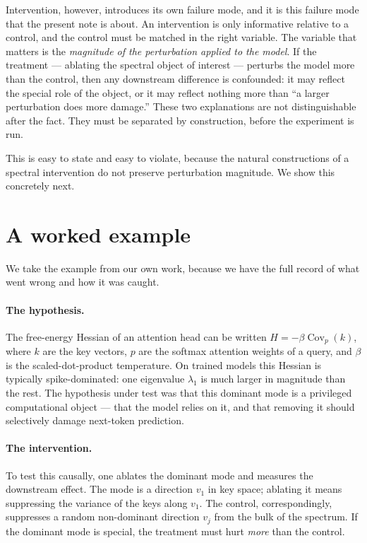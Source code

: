 \documentclass[11pt]{article}
\begin{document}
Intervention, however, introduces its own failure mode, and it is this
failure mode that the present note is about. An intervention is only
informative relative to a control, and the control must be matched in the
right variable. The variable that matters is the \emph{magnitude of the
perturbation applied to the model}. If the treatment --- ablating the
spectral object of interest --- perturbs the model more than the control,
then any downstream difference is confounded: it may reflect the special
role of the object, or it may reflect nothing more than ``a larger
perturbation does more damage.'' These two explanations are not
distinguishable after the fact. They must be separated by construction,
before the experiment is run.

This is easy to state and easy to violate, because the natural
constructions of a spectral intervention do not preserve perturbation
magnitude. We show this concretely next.

\section{A worked example}
\label{sec:example}

We take the example from our own work, because we have the full record of
what went wrong and how it was caught.

\paragraph{The hypothesis.}
The free-energy Hessian of an attention head can be written
$H=-\beta\operatorname{Cov}_p(k)$, where $k$ are the key vectors, $p$ are
the softmax attention weights of a query, and $\beta$ is the
scaled-dot-product temperature. On trained models this Hessian is
typically spike-dominated: one eigenvalue $\lambda_1$ is much larger in
magnitude than the rest. The hypothesis under test was that this dominant
mode is a privileged computational object --- that the model relies on it,
and that removing it should selectively damage next-token prediction.

\paragraph{The intervention.}
To test this causally, one ablates the dominant mode and measures the
downstream effect. The mode is a direction $v_1$ in key space; ablating it
means suppressing the variance of the keys along $v_1$. The control,
correspondingly, suppresses a random non-dominant direction $v_j$ from the
bulk of the spectrum. If the dominant mode is special, the treatment must
hurt \emph{more} than the control.
\end{document}
